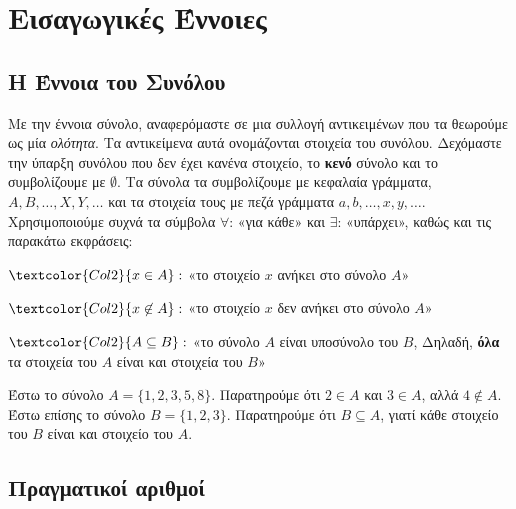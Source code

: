 \chapter{Εισαγωγικές Έννοιες}


\section{Η Έννοια του Συνόλου}

Με την έννοια \textcolor{Col1}{σύνολο}, αναφερόμαστε σε μια συλλογή αντικειμένων που τα 
θεωρούμε ως μία \textit{ολότητα}. 
Τα αντικείμενα αυτά ονομάζονται \textcolor{Col1}{στοιχεία} του 
συνόλου. Δεχόμαστε την ύπαρξη συνόλου που δεν έχει κανένα στοιχείο, το \textbf{κενό} 
σύνολο και το συμβολίζουμε με $ \emptyset $. Τα σύνολα τα συμβολίζουμε με κεφαλαία
γράμματα, $ A, B, \ldots, X, Y, \ldots $ και τα στοιχεία τους με πεζά γράμματα $ a,b,
\ldots, x,y, \ldots $. Χρησιμοποιούμε συχνά τα σύμβολα $ \forall $:
«\textcolor{Col1}{για κάθε}» και $ \exists $: «\textcolor{Col1}{υπάρχει}», 
καθώς και τις παρακάτω εκφράσεις:
\begin{center}
  \begin{myitemize}
    \item $ \textcolor{Col2}{x \in A} : $ «το στοιχείο $x$ \textcolor{Col1}{ανήκει} στο 
      σύνολο $A$» \\
    \item $ \textcolor{Col2}{x \not\in A} : $ «το στοιχείο $x$ \textcolor{Col1}{δεν 
      ανήκει} στο σύνολο $A$» \\
    \item $\textcolor{Col2}{A \subseteq B} :$ «το σύνολο $A$ είναι
      \textcolor{Col1}{υποσύνολο} του $B$, Δηλαδή, \textbf{όλα} τα στοιχεία του $A$ είναι
      και στοιχεία του $B$»
  \end{myitemize}
\end{center}

\begin{example}
  Έστω το σύνολο $ A = \{ 1,2,3,5,8 \} $. Παρατηρούμε ότι $ 2 \in A $ και $ 3 \in A $, 
  αλλά $ 4 \not \in A $. Έστω επίσης το σύνολο $ B = \{ 1,2,3 \} $. Παρατηρούμε ότι 
  $ B \subseteq A $, γιατί κάθε στοιχείο του $B$ είναι και στοιχείο του $A$.
\end{example}


\section{Πραγματικοί αριθμοί} 

\enlargethispage{3\baselineskip}

